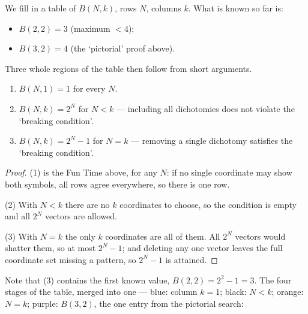 We fill in a table of \(B(N, k)\), rows \(N\), columns \(k\). What is known
so far is:

\begin{itemize}
    \item \(B(2, 2) = 3\) (maximum \(< 4\));
    \item \(B(3, 2) = 4\) (the `pictorial' proof above).
\end{itemize}

Three whole regions of the table then follow from short arguments.

\begin{proposition}\label{prop:B-basic}
    \leavevmode
    \begin{enumerate}
        \item \(B(N, 1) = 1\) for every \(N\).
        \item \(B(N, k) = 2^N\) for \(N < k\) --- including all dichotomies does
            not violate the `breaking condition'.
        \item \(B(N, k) = 2^N - 1\) for \(N = k\) --- removing a single dichotomy
            satisfies the `breaking condition'.
    \end{enumerate}
\end{proposition}

\begin{proof}
    (1) is the Fun Time above, for any \(N\): if no single coordinate may show
    both symbols, all rows agree everywhere, so there is one row.

    (2) With \(N < k\) there are no \(k\) coordinates to choose, so the
    condition is empty and all \(2^N\) vectors are allowed.

    (3) With \(N = k\) the only \(k\) coordinates are all of them. All \(2^N\)
    vectors would shatter them, so at most \(2^N - 1\); and deleting any one
    vector leaves the full coordinate set missing a pattern, so \(2^N - 1\) is
    attained.
\end{proof}

Note that (3) contains the first known value, \(B(2, 2) = 2^2 - 1 = 3\). The
four stages of the table, merged into one --- \textcolor{blue!75!black}{blue}:
column \(k = 1\); black: \(N < k\); \textcolor{orange!85!black}{orange}:
\(N = k\); purple: \(B(3, 2)\), the one entry from the pictorial search:

